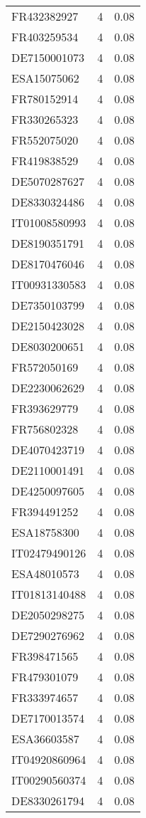 \begin{table*}[htbp]
\begin{tabular}{lrr}
FR432382927 & 4 & 0.08 \\
FR403259534 & 4 & 0.08 \\
DE7150001073 & 4 & 0.08 \\
ESA15075062 & 4 & 0.08 \\
FR780152914 & 4 & 0.08 \\
FR330265323 & 4 & 0.08 \\
FR552075020 & 4 & 0.08 \\
FR419838529 & 4 & 0.08 \\
DE5070287627 & 4 & 0.08 \\
DE8330324486 & 4 & 0.08 \\
IT01008580993 & 4 & 0.08 \\
DE8190351791 & 4 & 0.08 \\
DE8170476046 & 4 & 0.08 \\
IT00931330583 & 4 & 0.08 \\
DE7350103799 & 4 & 0.08 \\
DE2150423028 & 4 & 0.08 \\
DE8030200651 & 4 & 0.08 \\
FR572050169 & 4 & 0.08 \\
DE2230062629 & 4 & 0.08 \\
FR393629779 & 4 & 0.08 \\
FR756802328 & 4 & 0.08 \\
DE4070423719 & 4 & 0.08 \\
DE2110001491 & 4 & 0.08 \\
DE4250097605 & 4 & 0.08 \\
FR394491252 & 4 & 0.08 \\
ESA18758300 & 4 & 0.08 \\
IT02479490126 & 4 & 0.08 \\
ESA48010573 & 4 & 0.08 \\
IT01813140488 & 4 & 0.08 \\
DE2050298275 & 4 & 0.08 \\
DE7290276962 & 4 & 0.08 \\
FR398471565 & 4 & 0.08 \\
FR479301079 & 4 & 0.08 \\
FR333974657 & 4 & 0.08 \\
DE7170013574 & 4 & 0.08 \\
ESA36603587 & 4 & 0.08 \\
IT04920860964 & 4 & 0.08 \\
IT00290560374 & 4 & 0.08 \\
DE8330261794 & 4 & 0.08 \\

\end{tabular}
\end{table*}
